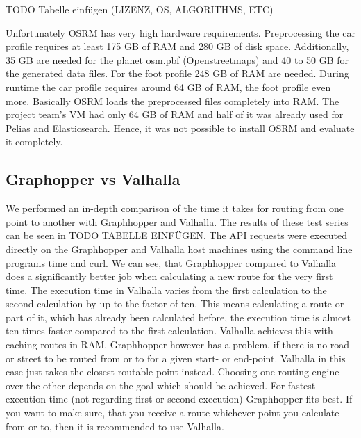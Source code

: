TODO Tabelle einfügen (LIZENZ, OS, ALGORITHMS, ETC)






Unfortunately OSRM has very high hardware requirements\citep{J.2017}. Preprocessing the car profile requires at least 175 GB of RAM and 280 GB of disk space. Additionally, 35 GB are needed for the planet osm.pbf (Openstreetmaps) and 40 to 50 GB for the generated data files. For the foot profile 248 GB of RAM are needed. During runtime the car profile requires around 64 GB of RAM, the foot profile even more. Basically OSRM loads the preprocessed files completely into RAM\citep{J.2017}. The project team's VM had only 64 GB of RAM and half of it was already used for Pelias and Elasticsearch. Hence, it was not possible to install OSRM and evaluate it completely.

\subsection{Graphopper vs Valhalla}
We performed an in-depth comparison of the time it takes for routing from one point to another with Graphhopper and Valhalla. The results of these test series can be seen in TODO TABELLE EINFÜGEN. The API requests were executed directly on the Graphhopper and Valhalla host machines using the command line programs time and curl.
We can see, that Graphhopper compared to Valhalla does a significantly better job when calculating a new route for the very first time. The execution time in Valhalla varies from the first calculation to the second calculation by up to the factor of ten. This means calculating a route or part of it, which has already been calculated before, the execution time is almost ten times faster compared to the first calculation. Valhalla achieves this with caching routes in RAM. Graphhopper however has a problem, if there is no road or street to be routed from or to for a given start- or end-point. Valhalla in this case just takes the closest routable point instead.  Choosing one routing engine over the other depends on the goal which should be achieved. For fastest execution time (not regarding first or second execution) Graphhopper fits best. If you want to make sure, that you receive a route whichever point you calculate from or to, then it is recommended to use Valhalla.

